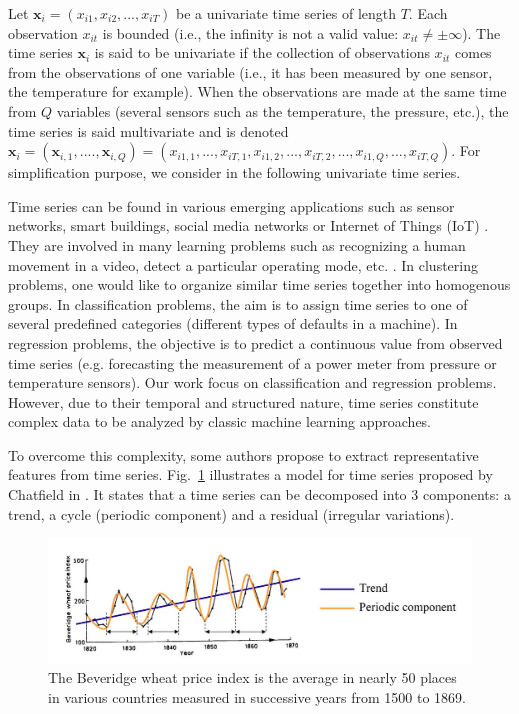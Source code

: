 Let $\textbf{x}_i=(x_{i1}, x_{i2}, ..., x_{iT})$ be a univariate time series of length $T$. Each observation $x_{it}$ is bounded (i.e., the infinity is not a valid value: $x_{it} \neq \pm \infty$). The time series $\textbf{x}_i$ is said to be univariate if the collection of observations $x_{it}$ comes from the observations of one variable (i.e., it has been measured by one sensor, the temperature for example). When the observations are made at the same time from $Q$ variables (several sensors such as the temperature, the pressure, etc.), the time series is said multivariate and is denoted $\textbf{x}_i=(\textbf{x}_{i,1}, ...., \textbf{x}_{i,Q})=(x_{i1,1}, ..., x_{iT,1},x_{i1,2}, ..., x_{iT,2}, ..., x_{i1,Q}, ..., x_{iT,Q})$. For simplification purpose, we consider in the following univariate time series. 

Time series can be found in various emerging applications such as sensor networks, smart buildings, social media networks or Internet of Things (IoT) \cite{Najmeddine2012,Nguyen2012,Yin2008}. They are involved in many learning problems such as recognizing a human movement in a video, detect a particular operating mode, etc. . In clustering problems, one would like to organize similar time series together into homogenous groups. In classification problems, the aim is to assign time series to one of several predefined categories (different types of defaults in a machine). In regression problems, the objective is to predict a continuous value from observed time series (e.g. forecasting the measurement of a power meter from pressure or temperature sensors). Our work focus on classification and regression problems. However, due to their temporal and structured nature, time series constitute complex data to be analyzed by classic machine learning approaches.

To overcome this complexity, some authors propose to extract representative features from time series. Fig.~\ref{fig:time_series_example} illustrates a model for time series proposed by Chatfield in \cite{Chatfield2004}. It states that a time series can be decomposed into 3 components: a trend, a cycle (periodic component) and a residual (irregular variations). 

\begin{figure}[h!]
\centering
\includegraphics[width=0.9\linewidth]{images/time_series_example}
\caption{The Beveridge wheat price index is the average in nearly 50 places in various countries measured in successive years from 1500 to 1869. \protect\footnotemark}
\label{fig:time_series_example}
\end{figure}


